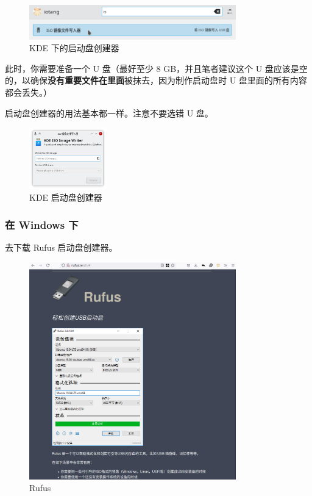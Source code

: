 \documentclass[UTF-8]{ctexart}
\begin{document}
				\begin{figure}[H]
					\centering
					\includegraphics[width=0.8\textwidth]{fig/iso_burn.png}
					\caption*{KDE 下的启动盘创建器}
				\end{figure}
				
				此时，你需要准备一个 U 盘（最好至少 8 GB，并且笔者建议这个 U 盘应该是空的，以确保\textbf{\large 没有重要文件在里面}被抹去，因为制作启动盘时 U 盘里面的所有内容都会丢失。）
				
				启动盘创建器的用法基本都一样。注意不要选错 U 盘。
			
				\begin{figure}[H]
					\centering
					\includegraphics[width=0.3\textwidth]{fig/isoimagewriter.png}
					\caption*{KDE 启动盘创建器}
				\end{figure}


			\subsubsection{在 Windows 下}
			
				去下载 Rufus 启动盘创建器。
				
				\begin{figure}[H]
					\centering
					\includegraphics[width=0.8\textwidth]{fig/rufus.png}
					\caption*{Rufus}
				\end{figure}
			
\end{document}
